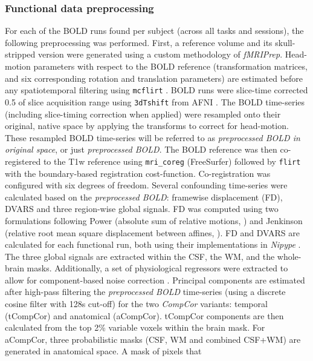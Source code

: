 \documentclass[fleqn,10pt]{wlscirep}
\begin{document}
\subsubsection*{Functional data preprocessing}
For each of the BOLD runs found per subject (across all tasks and
sessions), the following preprocessing was performed. First, a reference
volume and its skull-stripped version were generated using a custom
methodology of \emph{fMRIPrep}. Head-motion parameters with respect to
the BOLD reference (transformation matrices, and six corresponding
rotation and translation parameters) are estimated before any
spatiotemporal filtering using \texttt{mcflirt} \citep[FSL
,][]{mcflirt}. BOLD runs were slice-time corrected 0.5 of
slice acquisition range using \texttt{3dTshift} from AFNI
\citep[RRID:SCR\_005927]{afni}. The BOLD time-series (including
slice-timing correction when applied) were resampled onto their
original, native space by applying the transforms to correct for
head-motion. These resampled BOLD time-series will be referred to as
\emph{preprocessed BOLD in original space}, or just \emph{preprocessed
BOLD}. The BOLD reference was then co-registered to the T1w reference
using \texttt{mri\_coreg} (FreeSurfer) followed by \texttt{flirt}
\citep[FSL ,][]{flirt} with the boundary-based registration \citep{bbr}
cost-function. Co-registration was configured with six degrees of
freedom. Several confounding time-series were calculated based on the
\emph{preprocessed BOLD}: framewise displacement (FD), DVARS and three
region-wise global signals. FD was computed using two formulations
following Power (absolute sum of relative motions,
\citet{power_fd_dvars}) and Jenkinson (relative root mean square
displacement between affines, \citet{mcflirt}). FD and DVARS are
calculated for each functional run, both using their implementations in
\emph{Nipype} \citep[following the definitions by][]{power_fd_dvars}.
The three global signals are extracted within the CSF, the WM, and the
whole-brain masks. Additionally, a set of physiological regressors were
extracted to allow for component-based noise correction
\citep[\emph{CompCor},][]{compcor}. Principal components are estimated
after high-pass filtering the \emph{preprocessed BOLD} time-series
(using a discrete cosine filter with 128s cut-off) for the two
\emph{CompCor} variants: temporal (tCompCor) and anatomical (aCompCor).
tCompCor components are then calculated from the top 2\% variable voxels
within the brain mask. For aCompCor, three probabilistic masks (CSF, WM
and combined CSF+WM) are generated in anatomical space. A mask of pixels that
\end{document}
